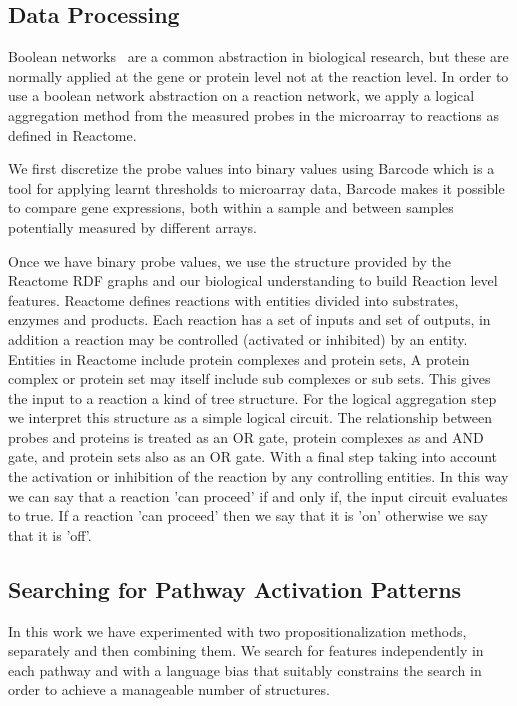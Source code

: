 \documentclass[runningheads,a4paper]{llncs}
\begin{document}
\subsection{Data Processing}
Boolean networks~\citep{wang_boolean_2012} are a common abstraction in biological research, but these are normally applied at the gene or protein level not at the reaction level. In order to use a boolean network abstraction on a reaction network, we apply a logical aggregation method from the measured probes in the microarray to reactions as defined in Reactome.

We first discretize the probe values into binary values using Barcode \citep{mccall_gene_2014} which is a tool for applying learnt thresholds to microarray data,  Barcode makes it possible to compare gene expressions, both within a sample and between samples potentially measured by different arrays. 

Once we have binary probe values, we use the structure provided by
the Reactome RDF graphs and our biological understanding to build Reaction level features.
Reactome defines reactions with entities divided into substrates, enzymes and products. Each reaction has a set of inputs and set of outputs, in addition a reaction may be controlled (activated or inhibited) by an entity. Entities in Reactome include protein complexes and protein sets, A protein complex or protein set may itself include sub complexes or sub sets. This gives the input to a reaction a kind of tree structure. For the logical aggregation step we interpret this structure as a simple logical circuit. The relationship between probes and proteins is treated as an OR gate, protein complexes as and AND gate, and protein sets also as an OR gate. With a final step taking into account the activation or inhibition of the reaction by any controlling entities. In this way we can say that a reaction 'can proceed' if and only if, the input circuit evaluates to true. If a reaction 'can proceed' then we say that it is 'on' otherwise we say that it is 'off'. 

\subsection{Searching for Pathway Activation Patterns}
In this work we have experimented with two propositionalization methods, separately and then combining them. We search for features independently in each pathway and with a language bias that suitably constrains the search in order to achieve a manageable number of structures. 
\end{document}
